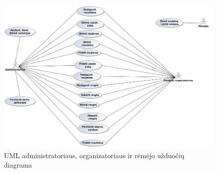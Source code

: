 \documentclass{VUMIFPSkursinis}
\begin{document}
			\begin{figure}[H]
                \centering
                \includegraphics[width=\textwidth]{img/PSI4/Diagrams/UCadmin.png}
                \caption{UML administratoriaus, organizatoriaus ir rėmėjo užduočių diagrama}
                \label{fig:uzduociu-diagrama2}
            \end{figure}
		\newpage
\end{document}
